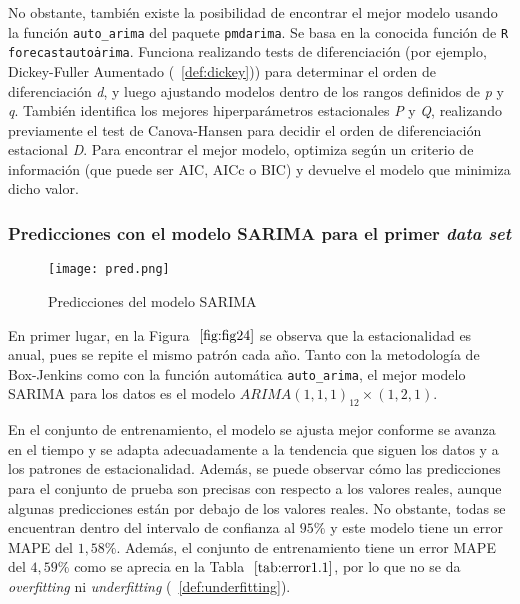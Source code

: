 \documentclass[12pt,twoside]{article}
\begin{document}
No obstante, también existe la posibilidad de encontrar el mejor modelo usando la función \texttt{auto\_arima} del paquete \texttt{pmdarima}. Se basa en la conocida función de \texttt{R} \newline \texttt{forecast\:\:auto\.arima}. Funciona realizando tests de diferenciación (por ejemplo, Dickey-Fuller Aumentado (~\ref{def:dickey})) para determinar el orden de diferenciación \textit{d}, y luego ajustando modelos dentro de los rangos definidos de \textit{p} y \textit{q}. También identifica los mejores hiperparámetros estacionales \textit{P} y \textit{Q}, realizando previamente el test de Canova-Hansen para decidir el orden de diferenciación estacional \textit{D}. Para encontrar el mejor modelo, optimiza según un criterio de información (que puede ser AIC, AICc o BIC) y devuelve el modelo que minimiza dicho valor.

\subsubsection{Predicciones con el modelo SARIMA para el primer \textit{data set}}\label{sec:36}

\begin{figure}[h]
    \centering
    \texttt{[image: pred.png]}
    \caption{Predicciones del modelo SARIMA} 
    \label{fig:fig24}
\end{figure}

En primer lugar, en la Figura $~\ref{fig:fig24}$ se observa que la estacionalidad es anual, pues se repite el mismo patrón cada año. Tanto con la metodología de Box-Jenkins como con la función automática \texttt{auto\_arima}, el mejor modelo SARIMA para los datos es el modelo $ARIMA(1,1,1)_{12} \times (1,2,1)$.

En el conjunto de entrenamiento, el modelo se ajusta mejor conforme se avanza en el tiempo y se adapta adecuadamente a la tendencia que siguen los datos y a los patrones de estacionalidad. Además, se puede observar cómo las predicciones para el conjunto de prueba son precisas con respecto a los valores reales, aunque algunas predicciones están por debajo de los valores reales. No obstante, todas se encuentran dentro del intervalo de confianza al $95\%$ y este modelo tiene un error MAPE del $1,58\%$.  Además, el conjunto de entrenamiento tiene un error MAPE del $4,59\%$ como se aprecia en la Tabla $~\ref{tab:error1.1}$, por lo que no se da \textit{overfitting} ni \textit{underfitting} (~\ref{def:underfitting}).
\end{document}
